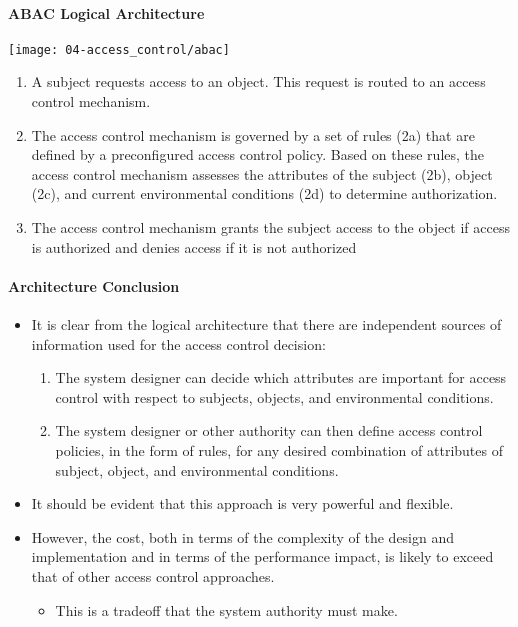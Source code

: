 \paragraph{ABAC Logical Architecture}
\begin{center}
    \texttt{[image: 04-access\_control/abac]}
    \vspace{-8pt}
\end{center}

\begin{enumerate}
    \item A subject requests access to an object. This request is routed to an access control mechanism.
    \item The access control mechanism is governed by a set of rules (2a) that are defined by a preconfigured access control policy. Based on these rules, the access control mechanism assesses the attributes of the subject (2b), object (2c), and current environmental conditions (2d) to determine authorization.
    \item The access control mechanism grants the subject access to the object if access is authorized and denies access if it is not authorized
\end{enumerate}

\newpage

\paragraph{Architecture Conclusion}
\begin{itemize}
    \item It is clear from the logical architecture that there are independent sources of information used for the access control decision:
    \begin{enumerate}
        \item The system designer can decide which attributes are important for access control with respect to subjects, objects, and environmental conditions.
        \item The system designer or other authority can then define access control policies, in the form of rules, for any desired combination of attributes of subject, object, and environmental conditions.
    \end{enumerate}
    \item It should be evident that this approach is very powerful and flexible.
    \item However, the cost, both in terms of the complexity of the design and implementation and in terms of the performance impact, is likely to exceed that of other access control approaches.
    \begin{itemize}
        \item This is a tradeoff that the system authority must make.
    \end{itemize}
\end{itemize}

